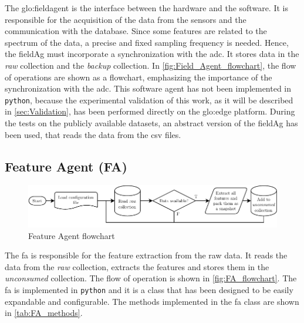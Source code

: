 The \gls{glo:fieldagent} is the interface between the hardware and the software. It is responsible for the acquisition of the data from the sensors and the communication with the database. Since some features are related to the spectrum of the data, a precise and fixed sampling frequency is needed. Hence, the \gls{fieldAg} must incorporate a synchronization with the \gls{adc}. It stores data in the \emph{raw} collection and the \emph{backup} collection. In \autoref{fig:Field_Agent_flowchart}, the flow of operations are shown as a flowchart, emphasizing the importance of the synchronization with the \gls{adc}. This software agent has not been implemented in \texttt{python}, because the experimental validation of this work, as it will be described in \autoref{sec:Validation}, has been performed directly on the \gls{glo:edge} platform. During the tests on the publicly available datasets, an abstract version of the \gls{fieldAg} has been used, that reads the data from the \gls{csv} files.


\subsection{Feature Agent (FA)}
\label{subsec:FeatureAgent}
\begin{figure}
    \centering
    \includegraphics[width=\textwidth]{images/Framework/FA_flowchart.pdf}
    \caption{Feature Agent flowchart}
    \label{fig:FA_flowchart}
\end{figure}

The \gls{fa} is responsible for the feature extraction from the raw data. It reads the data from the \emph{raw} collection, extracts the features and stores them in the \emph{unconsumed} collection. The flow of operation is shown in \autoref{fig:FA_flowchart}. The \gls{fa} is implemented in \texttt{python} and it is a class that has been designed to be easily expandable and configurable. The methods implemented in the \gls{fa} class are shown in \autoref{tab:FA_methods}.


